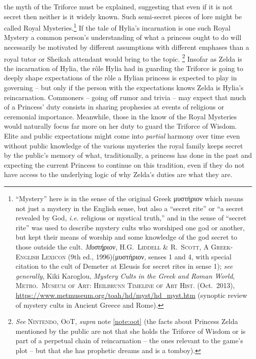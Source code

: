 \documentclass[../FGP.tex]{subfiles}
\begin{document}
the myth of the Triforce must be explained, suggesting that even if it is not secret then neither is it widely known. Such semi-secret pieces of lore might be called Royal Mysteries.\footnote{``Mystery'' here is in the sense of the original Greek {\Gr μυστήριον} which means not just a mystery in the English sense, but also a ``secret rite'' or ``a secret revealed by God, \emph{i.e.} religious or mystical truth,'' and in the sense of ``secret rite'' was used to describe mystery cults who worshiped one god or another, but kept their means of worship and some knowledge of the god secret to those outside the cult. \textit{\Gr Μυστήριον}, \textsc{H.G.~Liddell \& R.~Scott, A Greek-English Lexicon} (9th ed., 1996)({\Gr μυστήριον}, senses 1 and 4, with special citation to the cult of Demeter at Eleusis for secret rites in sense 1); \textit{see generally}, Kiki Karoglou, \textit{Mystery Cults in the Greek and Roman World}, \textsc{Metro.~Museum of Art: Heilbrunn Timeline of Art Hist.} (Oct.~2013), \url{https://www.metmuseum.org/toah/hd/myst/hd_myst.htm} (synoptic review of mystery cults in Ancient Greece and Rome).} If the tale of Hylia's incarnation is one such Royal Mystery a common person's understanding of what a princess ought to do will necessarily be motivated by different assumptions with different emphases than a royal tutor or Sheikah attendant would bring to the topic.%
  \footnote{\textit{See} \textsc{Nintendo, OoT}, \textit{supra} note \ref{note:oot} (the facts about Princess Zelda mentioned by the public are not that she holds the Triforce of Wisdom or is part of a perpetual chain of reincarnation -- the ones relevant to the game's plot -- but that she has prophetic dreams and is a tomboy).}
Insofar as Zelda is the incarnation of Hylia, the r\^ole Hylia had in guarding the Triforce is going to deeply shape expectations of the r\^ole a Hylian princess is expected to play in governing -- but only if the person with the expectations knows Zelda is Hylia's reincarnation. Commoners -- going off rumor and trivia -- may expect that much of a Princess' duty consists in sharing prophesies at events of religious or ceremonial importance. Meanwhile, those in the know of the Royal Mysteries would naturally focus far more on her duty to guard the Triforce of Wisdom. Elite and public expectations might come into \emph{partial} harmony over time even without public knowledge of the various mysteries the royal family keeps secret by the public's memory of what, traditionally, a princess has done in the past and expecting the current Princess to continue on this tradition, even if they do not have access to the underlying logic of why Zelda's duties are what they are.%
\end{document}

